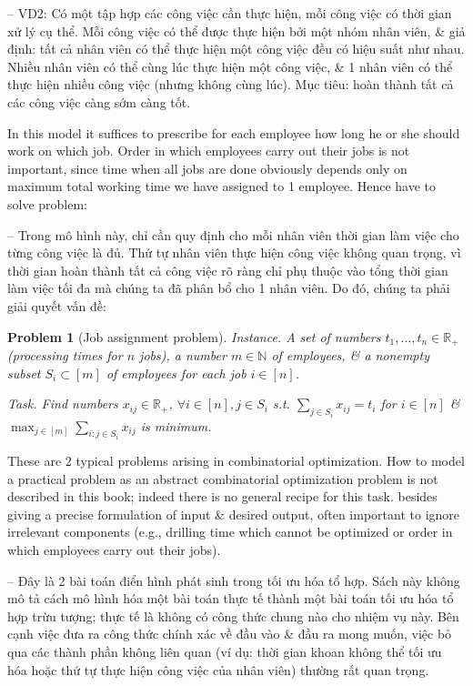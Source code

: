 \documentclass{article}
\newtheorem{problem}{Problem}
\begin{document}
\begin{itemize}
    -- VD2: Có một tập hợp các công việc cần thực hiện, mỗi công việc có thời gian xử lý cụ thể. Mỗi công việc có thể được thực hiện bởi một nhóm nhân viên, \& giả định: tất cả nhân viên có thể thực hiện một công việc đều có hiệu suất như nhau. Nhiều nhân viên có thể cùng lúc thực hiện một công việc, \& 1 nhân viên có thể thực hiện nhiều công việc (nhưng không cùng lúc). Mục tiêu: hoàn thành tất cả các công việc càng sớm càng tốt.

    In this model it suffices to prescribe for each employee how long he or she should work on which job. Order in which employees carry out their jobs is not important, since time when all jobs are done obviously depends only on maximum total working time we have assigned to 1 employee. Hence have to solve problem:

    -- Trong mô hình này, chỉ cần quy định cho mỗi nhân viên thời gian làm việc cho từng công việc là đủ. Thứ tự nhân viên thực hiện công việc không quan trọng, vì thời gian hoàn thành tất cả công việc rõ ràng chỉ phụ thuộc vào tổng thời gian làm việc tối đa mà chúng ta đã phân bổ cho 1 nhân viên. Do đó, chúng ta phải giải quyết vấn đề:

    \begin{problem}[Job assignment problem]
        \item {\sf Instance.} A set of numbers $t_1,\ldots,t_n\in\mathbb{R}_+$ (processing times for $n$ jobs), a number $m\in\mathbb{N}$ of employees, \& a nonempty subset $S_i\subset[m]$ of employees for each job $i\in[n]$.
        \item {\sf Task.} Find numbers $x_{ij}\in\mathbb{R}_+$, $\forall i\in[n],j\in S_i$ s.t. $\sum_{j\in S_i} x_{ij} = t_i$ for $i\in[n]$ \& $\max_{j\in[m]} \sum_{i:j\in S_i} x_{ij}$ is minimum.
    \end{problem}
    These are 2 typical problems arising in combinatorial optimization. How to model a practical problem as an abstract combinatorial optimization problem is not described in this book; indeed there is no general recipe for this task. besides giving a precise formulation of input \& desired output, often important to ignore irrelevant components (e.g., drilling time which cannot be optimized or order in which employees carry out their jobs).

    -- Đây là 2 bài toán điển hình phát sinh trong tối ưu hóa tổ hợp. Sách này không mô tả cách mô hình hóa một bài toán thực tế thành một bài toán tối ưu hóa tổ hợp trừu tượng; thực tế là không có công thức chung nào cho nhiệm vụ này. Bên cạnh việc đưa ra công thức chính xác về đầu vào \& đầu ra mong muốn, việc bỏ qua các thành phần không liên quan (ví dụ: thời gian khoan không thể tối ưu hóa hoặc thứ tự thực hiện công việc của nhân viên) thường rất quan trọng.


\end{itemize}
\end{document}
